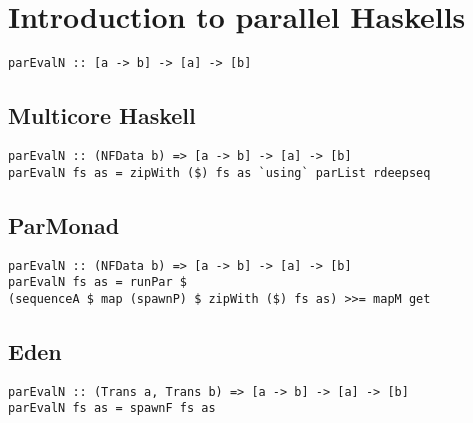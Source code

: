 \section{Introduction to parallel Haskells}

\begin{lstlisting}[frame=htrbl]
parEvalN :: [a -> b] -> [a] -> [b]
\end{lstlisting}

\frbreak

\subsection{Multicore Haskell}
\begin{lstlisting}[frame=htrbl]
parEvalN :: (NFData b) => [a -> b] -> [a] -> [b]
parEvalN fs as = zipWith ($) fs as `using` parList rdeepseq
\end{lstlisting}

\frbreak

\subsection{ParMonad}
\begin{lstlisting}[frame=htrbl]
parEvalN :: (NFData b) => [a -> b] -> [a] -> [b]
parEvalN fs as = runPar $ 
(sequenceA $ map (spawnP) $ zipWith ($) fs as) >>= mapM get
\end{lstlisting}

\frbreak

\subsection{Eden}
\begin{lstlisting}[frame=htrbl]
parEvalN :: (Trans a, Trans b) => [a -> b] -> [a] -> [b]
parEvalN fs as = spawnF fs as
\end{lstlisting}